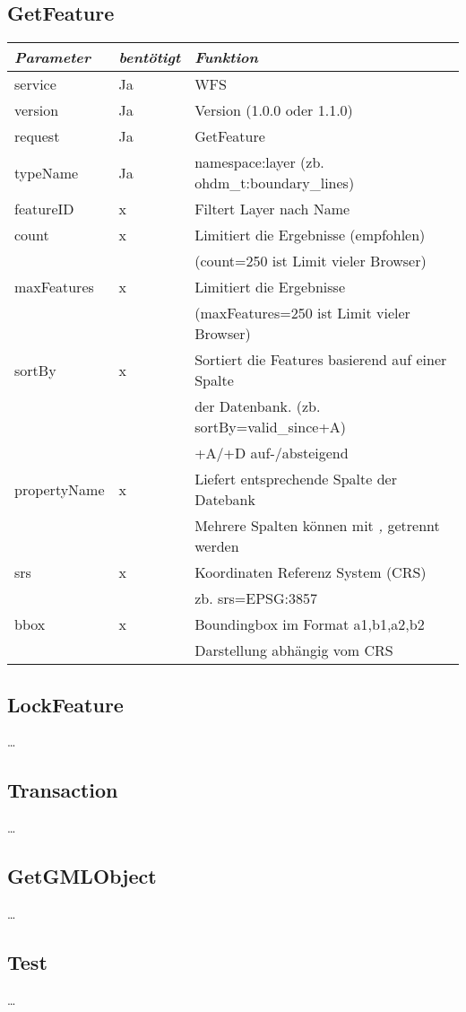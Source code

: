 \documentclass[12pt]{article}
\begin{document}
\subsection{GetFeature}
\begin{tabular}{lll}
\emph{Parameter} & \emph{bentötigt} & \emph{Funktion} \\
\hline
service	& Ja & 	 WFS\\
\hline
version	& Ja &	 Version (1.0.0 oder 1.1.0)\\
\hline
request	& Ja &	GetFeature\\
\hline
typeName	& Ja &	namespace:layer (zb. ohdm\_t:boundary\_lines)\\
\hline
featureID & x & Filtert Layer nach Name\\
\hline
count & x & Limitiert die Ergebnisse (empfohlen)\\&& (count=250 ist Limit vieler Browser)\\
\hline
maxFeatures & x & Limitiert die Ergebnisse \\&&(maxFeatures=250 ist Limit vieler Browser)\\
\hline
sortBy & x & Sortiert die Features basierend auf einer Spalte \\&&der Datenbank. (zb. sortBy=valid\_since+A)\\&& +A/+D auf-/absteigend\\
\hline
propertyName & x & Liefert entsprechende Spalte der Datebank\\&&Mehrere Spalten können mit \emph{,} getrennt werden\\
\hline
srs & x & Koordinaten Referenz System (CRS)\\&& zb. srs=EPSG:3857\\
\hline
bbox & x& Boundingbox im Format a1,b1,a2,b2\\&& Darstellung abhängig vom CRS\\
\end{tabular}
\subsection{LockFeature}
\ldots
\subsection{Transaction}
\ldots
\subsection{GetGMLObject}
\ldots
\subsection{Test}
\ldots
\end{document}
